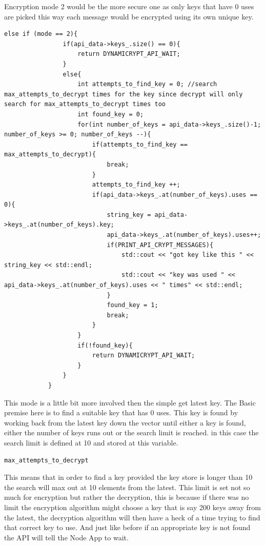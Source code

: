 Encryption mode 2 would be the more secure one as only keys that have 0 uses are picked this way each message would be encrypted using its own unique key.
\begin{lstlisting}
else if (mode == 2){
                if(api_data->keys_.size() == 0){
                    return DYNAMICRYPT_API_WAIT;
                }
                else{
                    int attempts_to_find_key = 0; //search max_attempts_to_decrypt times for the key since decrypt will only search for max_attempts_to_decrypt times too
                    int found_key = 0;
                    for(int number_of_keys = api_data->keys_.size()-1; number_of_keys >= 0; number_of_keys --){
                        if(attempts_to_find_key == max_attempts_to_decrypt){
                            break;
                        }
                        attempts_to_find_key ++;
                        if(api_data->keys_.at(number_of_keys).uses == 0){
                            string_key = api_data->keys_.at(number_of_keys).key;
                            api_data->keys_.at(number_of_keys).uses++;
                            if(PRINT_API_CRYPT_MESSAGES){
                                std::cout << "got key like this " << string_key << std::endl;
                                std::cout << "key was used " << api_data->keys_.at(number_of_keys).uses << " times" << std::endl;
                            }
                            found_key = 1;
                            break;
                        }
                    }
                    if(!found_key){
                        return DYNAMICRYPT_API_WAIT;
                    }
                }
            }
\end{lstlisting} 
This mode is a little bit more involved then the simple get latest key. The Basic premise here is to find a suitable key that has 0 uses. This key is found by working back from the latest key down the vector until either a key is found, either the number of keys runs out or the search limit is reached. in this case the search limit is defined at 10 and stored at this variable.
\begin{lstlisting}
max_attempts_to_decrypt
\end{lstlisting} 
This means that in order to find a key provided the key store is longer than 10 the search will max out at 10 elements from the latest. 
This limit is set not so much for encryption but rather the decryption, this is because if there was no limit the encryption algorithm might choose a key that is say 200 keys away from the latest, the decryption algorithm will then have a heck of a time trying to find that correct key to use. 
And just like before if an appropriate key is not found the API will tell the Node App to wait.

